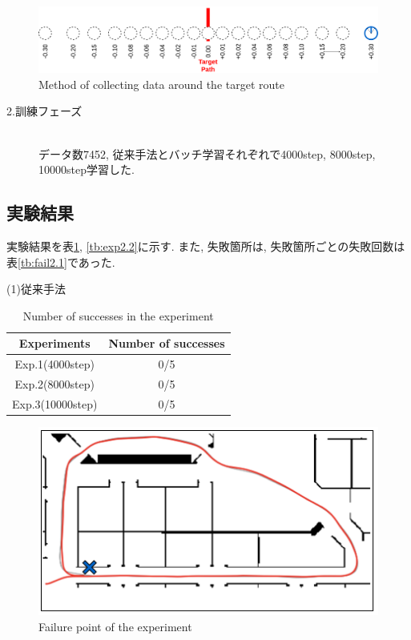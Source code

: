 \begin{figure}[h]
  \centering
  \includegraphics[keepaspectratio, scale=0.18]{images/collect-data.png}
  \caption{Method of collecting data around the target route}
  \label{Fig:collect-data}
  \end{figure}

\begin{description}
  \item[2.訓練フェーズ]\mbox{}\\データ数7452, 従来手法とバッチ学習それぞれで4000step, 8000step, 10000step学習した. 
\end{description}

\subsection{実験結果}
実験結果を表\ref{tb:exp2.1}, \ref{tb:exp2.2}に示す. また, 失敗箇所は, 失敗箇所ごとの失敗回数は表\ref{tb:fail2.1}であった. 

\newpage
\begin{description}
  \item [(1)従来手法]
\end{description}
\begin{table}[h]
  \centering
  \begin{tabular}{|c|c|} \hline
    Experiments & Number of successes \\ \hline
    Exp.1(4000step) & 0/5 \\ \hline
    Exp.2(8000step) & 0/5 \\ \hline
    Exp.3(10000step) & 0/5 \\ \hline
  \end{tabular}
  \caption{Number of successes in the experiment}
  \label{tb:exp2.1}
\end{table}

\begin{figure}[h]
  \centering
  \includegraphics[keepaspectratio, scale=0.5]{images/result2.png}
  \caption{Failure point of the experiment}
  \label{Fig:result2.1}
  \end{figure}

